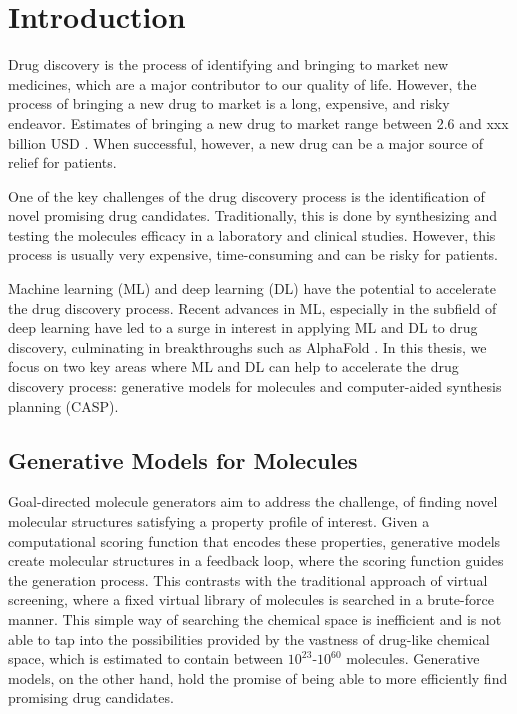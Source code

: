 \chapter{Introduction\label{chap:introduction}}
Drug discovery is the process of identifying and bringing to market new
medicines, which are a major contributor to our quality of life. However, the
process of bringing a new drug to market is a long, expensive, and risky endeavor.
Estimates of bringing a new drug to market range between 2.6 and xxx 
billion USD \citep{TODO}. When successful, however, a new drug can be a major source of
relief for patients.

One of the key challenges of the drug discovery process is the identification
of novel promising drug candidates. Traditionally, this is done by synthesizing
and testing the molecules efficacy in a laboratory and clinical studies. 
However, this process is usually very expensive, time-consuming and can be risky for 
patients. 

Machine learning (ML) and deep learning (DL) have the potential to accelerate
the drug discovery process. Recent advances in ML, especially in the subfield of deep learning
have led to a surge in interest in applying ML and DL to drug discovery, 
culminating in breakthroughs such as AlphaFold \citep{TODO}. 
In this thesis, we focus on two key areas where ML and DL can help to accelerate
the drug discovery process: generative models for molecules and computer-aided
synthesis planning (CASP).

\section{Generative Models for Molecules}
{Goal-directed molecule generators} aim to address the challenge, of finding novel
molecular structures satisfying a property profile of interest. Given a computational scoring
function that encodes these properties, generative models create molecular
structures in a feedback loop, where the scoring function guides the generation
process. This contrasts with the traditional approach of virtual screening, where
a fixed virtual library of molecules is searched in a brute-force manner. This simple way 
of searching the chemical space is inefficient and is not able to 
tap into the possibilities provided by the vastness of drug-like chemical space, which is 
estimated to contain between $10^{23}$-$10^{60}$ molecules.
Generative models, on the other hand, hold the promise of being able to more efficiently find
promising drug candidates.

